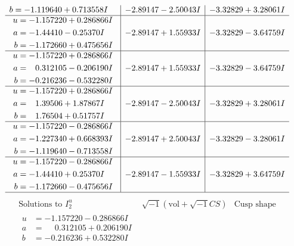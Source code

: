 \documentclass[1p]{elsarticle_modified}
\theoremstyle{definition}
\newcommand{\I}{\sqrt{-1}}
\begin{document}
$$\begin{array}{c|c|c}
\begin{aligned}
b &= -1.119640 + 0.713558 I\end{aligned}
 & -2.89147 - 2.50043 I & -3.32829 + 3.28061 I \\ \hline\begin{aligned}
u &= -1.157220 + 0.286866 I \\
a &= -1.44410 - 0.25370 I \\
b &= -1.172660 + 0.475656 I\end{aligned}
 & -2.89147 + 1.55933 I & -3.32829 - 3.64759 I \\ \hline\begin{aligned}
u &= -1.157220 + 0.286866 I \\
a &= \phantom{-}0.312105 - 0.206190 I \\
b &= -0.216236 - 0.532280 I\end{aligned}
 & -2.89147 + 1.55933 I & -3.32829 - 3.64759 I \\ \hline\begin{aligned}
u &= -1.157220 + 0.286866 I \\
a &= \phantom{-}1.39506 + 1.87867 I \\
b &= \phantom{-}1.76504 + 0.51757 I\end{aligned}
 & -2.89147 - 2.50043 I & -3.32829 + 3.28061 I \\ \hline\begin{aligned}
u &= -1.157220 - 0.286866 I \\
a &= -1.227340 + 0.668393 I \\
b &= -1.119640 - 0.713558 I\end{aligned}
 & -2.89147 + 2.50043 I & -3.32829 - 3.28061 I \\ \hline\begin{aligned}
u &= -1.157220 - 0.286866 I \\
a &= -1.44410 + 0.25370 I \\
b &= -1.172660 - 0.475656 I\end{aligned}
 & -2.89147 - 1.55933 I & -3.32829 + 3.64759 I\\
 \hline 
 \end{array}$$\newpage$$\begin{array}{c|c|c}  
\text{Solutions to }I^u_{2}& \I (\text{vol} + \sqrt{-1}CS) & \text{Cusp shape}\\
 \hline 
\begin{aligned}
u &= -1.157220 - 0.286866 I \\
a &= \phantom{-}0.312105 + 0.206190 I \\
b &= -0.216236 + 0.532280 I\end{aligned}

\end{array}$$
\end{document}
